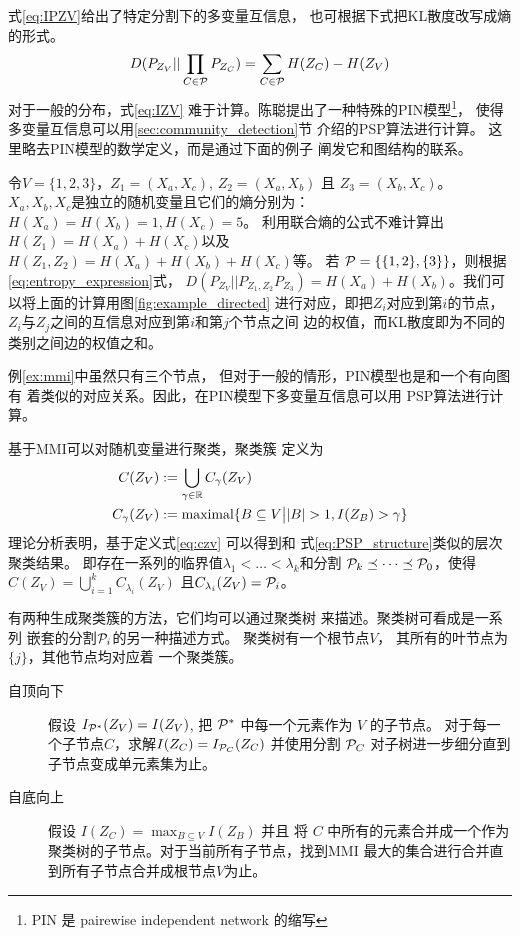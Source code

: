 式\eqref{eq:IPZV}给出了特定分割下的多变量互信息，
也可根据下式把KL散度改写成熵的形式。
\begin{equation}\label{eq:entropy_expression}
  D(P_{Z_V} || \prod_{C\in \P} P_{Z_C}) 
  = \sum_{C \in \P}
  H(Z_C) - H(Z_V)
\end{equation}
对于一般的分布，式\ref{eq:IZV}
难于计算。陈聪提出了一种特殊的PIN模型\cite{pin}\footnote{PIN 是 pairewise independent network
的缩写}，
使得多变量互信息可以用\ref{sec:community_detection}节
介绍的PSP算法进行计算。
这里略去PIN模型的数学定义，而是通过下面的例子
阐发它和图结构的联系。
\begin{example}\label{ex:mmi}
  令$V=\{1,2,3\}$，$Z_1=(X_a, X_c)$,
  $Z_2=(X_a,X_b)$ 且 $Z_3=(X_b,X_c)$。
  $X_a,X_b,X_c$是独立的随机变量且它们的熵分别为：
  $H(X_a)=H(X_b)=1, H(X_c)=5$。
  利用联合熵的公式不难计算出$H(Z_1)=H(X_a)+H(X_c)$以及
  $H(Z_1, Z_2) = H(X_a) + H(X_b) + H(X_c)$等。
  若 $\P=\{\{1,2\}, \{3\}\}$，则根据
  \eqref{eq:entropy_expression}式，
  $D(P_{Z_V}||P_{Z_1,Z_2}P_{Z_3}) = H(X_a)
  +H(X_b)$。我们可以将上面的计算用图\ref{fig:example_directed}
  进行对应，即把$Z_i$对应到第$i$的节点，
  $Z_i$与$Z_j$之间的互信息对应到第$i$和第$j$个节点之间
  边的权值，而KL散度即为不同的类别之间边的权值之和。
\end{example}
例\ref{ex:mmi}中虽然只有三个节点，
但对于一般的情形，PIN模型也是和一个有向图有
着类似的对应关系。因此，在PIN模型下多变量互信息可以用
PSP算法进行计算。

基于MMI可以对随机变量进行聚类，聚类簇
定义为
\begin{align}
  C(Z_V) &:= \bigcup_{\gamma \in \R} C_{\gamma}(Z_V)
  \label{eq:czv}\\
  C_{\gamma}(Z_V) &:= \textrm{maximal}
  \{ B \subseteq V \big\vert |B|>1, I(Z_B) > \gamma  \}
\end{align}
理论分析表明，基于定义式\ref{eq:czv} 可以得到和
式\ref{eq:PSP_structure}类似的层次聚类结果。
即存在一系列的临界值$\lambda_1 < \dots < \lambda_k$和分割
$\P_k \preceq \dots \preceq \P_0$，使得
$C(Z_V) = \bigcup_{i=1}^{k} C_{\lambda_i}(Z_V)$
且$C_{\lambda_i}(Z_V) = \P_i$。

有两种生成聚类簇的方法，它们均可以通过聚类树
来描述。聚类树可看成是一系列
嵌套的分割$\P_i$的另一种描述方式。
聚类树有一个根节点$V$，
其所有的叶节点为 $\{j\}$，其他节点均对应着
一个聚类簇。

\begin{description}
  \item[自顶向下] 假设 $I_{\P^*}(Z_V)=I(Z_V)$, 
  把 $\P^*$ 中每一个元素作为 $V$ 的子节点。
  对于每一个子节点$C$，求解$I(Z_C)=I_{\P_C}(Z_C)$
  并使用分割 $\P_C$ 对子树进一步细分直到子节点变成单元素集为止。
  \item[自底向上\footnotemark] 假设 $I(Z_C) = \max_{B\subseteq V} I(Z_B)$ 并且 
  将 $C$ 中所有的元素合并成一个作为聚类树的子节点。对于当前所有子节点，找到MMI
  最大的集合进行合并直到所有子节点合并成根节点$V$为止。
  \end{description}

